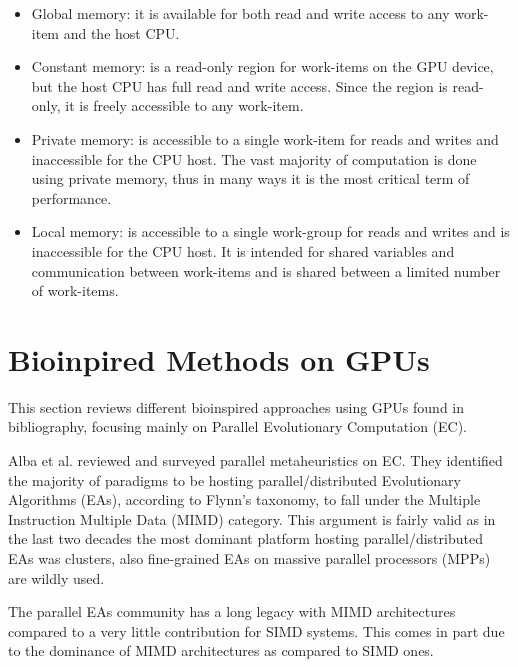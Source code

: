 \documentclass[prodmode,acmtecs]{acmsmall}
\begin{document}
\begin{itemize}
\item Global memory: it is available for both read and write access to any work-item and the host CPU.
\item Constant memory: is a read-only region for work-items on the GPU device, but the host CPU has full read and write access. Since the region is read-only, it is freely accessible to any work-item.
\item Private memory: is accessible to a single work-item for reads and writes and inaccessible for the CPU host. The vast majority of computation is done using private memory, thus in many ways it is the most critical term of performance.
\item Local memory: is accessible to a single work-group for reads and writes and is inaccessible for the CPU host. It is intended for shared variables and communication between work-items and is shared between a limited number of work-items.
\end{itemize} 


\section{Bioinpired Methods on GPUs}
\label{sec:bioinfor_apps}

This section reviews different bioinspired approaches using GPUs found in bibliography, focusing mainly on Parallel Evolutionary Computation (EC).

Alba et al. \cite{Alba2005book} reviewed and surveyed parallel metaheuristics on EC. They identified the majority of paradigms to be hosting parallel/distributed Evolutionary Algorithms (EAs), according to Flynn's taxonomy, to fall under the Multiple Instruction Multiple Data (MIMD) category. This argument is fairly valid as in the last two decades the most dominant platform hosting parallel/distributed EAs was clusters, also fine-grained EAs on massive parallel processors (MPPs) are wildly used.

The parallel EAs community has a long legacy with MIMD architectures compared to a very little contribution for SIMD systems. This comes in part due to the dominance of MIMD architectures as compared to SIMD ones.
\end{document}
